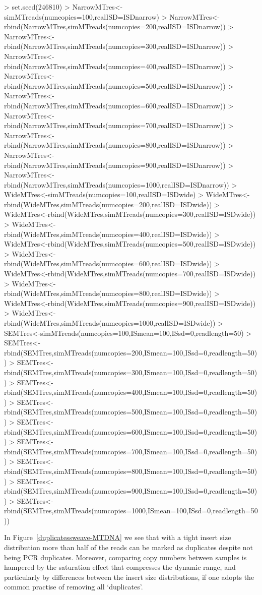 \documentclass{article}
\begin{document}
\begin{Schunk}
\begin{Sinput}
> set.seed(246810)
> NarrowMTres<-simMTreads(numcopies=100,realISD=ISDnarrow)
> NarrowMTres<-rbind(NarrowMTres,simMTreads(numcopies=200,realISD=ISDnarrow))
> NarrowMTres<-rbind(NarrowMTres,simMTreads(numcopies=300,realISD=ISDnarrow))
> NarrowMTres<-rbind(NarrowMTres,simMTreads(numcopies=400,realISD=ISDnarrow))
> NarrowMTres<-rbind(NarrowMTres,simMTreads(numcopies=500,realISD=ISDnarrow))
> NarrowMTres<-rbind(NarrowMTres,simMTreads(numcopies=600,realISD=ISDnarrow))
> NarrowMTres<-rbind(NarrowMTres,simMTreads(numcopies=700,realISD=ISDnarrow))
> NarrowMTres<-rbind(NarrowMTres,simMTreads(numcopies=800,realISD=ISDnarrow))
> NarrowMTres<-rbind(NarrowMTres,simMTreads(numcopies=900,realISD=ISDnarrow))
> NarrowMTres<-rbind(NarrowMTres,simMTreads(numcopies=1000,realISD=ISDnarrow))
> WideMTres<-simMTreads(numcopies=100,realISD=ISDwide)
> WideMTres<-rbind(WideMTres,simMTreads(numcopies=200,realISD=ISDwide))
> WideMTres<-rbind(WideMTres,simMTreads(numcopies=300,realISD=ISDwide))
> WideMTres<-rbind(WideMTres,simMTreads(numcopies=400,realISD=ISDwide))
> WideMTres<-rbind(WideMTres,simMTreads(numcopies=500,realISD=ISDwide))
> WideMTres<-rbind(WideMTres,simMTreads(numcopies=600,realISD=ISDwide))
> WideMTres<-rbind(WideMTres,simMTreads(numcopies=700,realISD=ISDwide))
> WideMTres<-rbind(WideMTres,simMTreads(numcopies=800,realISD=ISDwide))
> WideMTres<-rbind(WideMTres,simMTreads(numcopies=900,realISD=ISDwide))
> WideMTres<-rbind(WideMTres,simMTreads(numcopies=1000,realISD=ISDwide))
> SEMTres<-simMTreads(numcopies=100,ISmean=100,ISsd=0,readlength=50)
> SEMTres<-rbind(SEMTres,simMTreads(numcopies=200,ISmean=100,ISsd=0,readlength=50))
> SEMTres<-rbind(SEMTres,simMTreads(numcopies=300,ISmean=100,ISsd=0,readlength=50))
> SEMTres<-rbind(SEMTres,simMTreads(numcopies=400,ISmean=100,ISsd=0,readlength=50))
> SEMTres<-rbind(SEMTres,simMTreads(numcopies=500,ISmean=100,ISsd=0,readlength=50))
> SEMTres<-rbind(SEMTres,simMTreads(numcopies=600,ISmean=100,ISsd=0,readlength=50))
> SEMTres<-rbind(SEMTres,simMTreads(numcopies=700,ISmean=100,ISsd=0,readlength=50))
> SEMTres<-rbind(SEMTres,simMTreads(numcopies=800,ISmean=100,ISsd=0,readlength=50))
> SEMTres<-rbind(SEMTres,simMTreads(numcopies=900,ISmean=100,ISsd=0,readlength=50))
> SEMTres<-rbind(SEMTres,simMTreads(numcopies=1000,ISmean=100,ISsd=0,readlength=50))
\end{Sinput}
\end{Schunk}


In Figure~\ref{duplicatessweave-MTDNA} we see that with a tight insert size distribution more than half of the reads can be marked as duplicates despite not being PCR duplicates. Moreover, comparing copy numbers between samples is hampered by the saturation effect that compresses the dynamic range, and particularly by differences between the insert size distributions, if one adopts the common practise of removing all `duplicates'.
\end{document}
